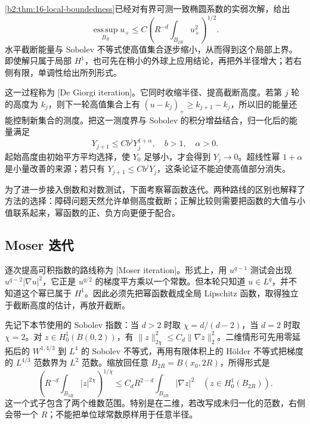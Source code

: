 \cref{b2:thm:16-local-boundedness}已经对有界可测一致椭圆系数的实弱次解，给出
\[
 \operatorname*{ess\,sup}_{B_R}u_+
 \leq C\left(R^{-d}\int_{B_{2R}}u_+^2\right)^{1/2}.
\]
水平截断能量与 Sobolev 不等式使高值集合逐步缩小，从而得到这个局部上界。即使解只属于局部 \(H^1\)，也可先在稍小的外球上应用结论，再把外半径增大；若右侧有限，单调性给出所列形式。

\ProseParagraphBreak

这一过程称为 [De Giorgi iteration]。它同时收缩半径、提高截断高度。若第 \(j\) 轮的高度为 \(k_j\)，则下一轮高值集合上有
\((u-k_j)_+\geq k_{j+1}-k_j\)，所以旧的能量还能控制新集合的测度。把这一测度界与 Sobolev 的积分增益结合，归一化后的能量满足
\[
 Y_{j+1}\leq Cb^jY_j^{1+\alpha},
 \quad b>1,\quad\alpha>0.
\]
起始高度由初始平方平均选择，使 \(Y_0\) 足够小，才会得到 \(Y_j\to0\)。超线性幂 \(1+\alpha\) 是小量改善的来源；若只有 \(Y_{j+1}\leq Cb^jY_j\)，这条论证不能迫使高值部分消失。

\ProseParagraphBreak

为了进一步接入倒数和对数测试，下面考察幂函数迭代。两种路线的区别也解释了方法的选择：障碍问题天然允许单侧高度截断；正解比较则需要把函数的大值与小值联系起来，幂函数的正、负方向更便于配合。

\subsection{Moser 迭代}
\label{b2:subsec:H20103}

逐次提高可积指数的路线称为 [Moser iteration]。形式上，用 \(u^{q-1}\) 测试会出现 \(u^{q-2}|\nabla u|^2\)，它正是 \(u^{q/2}\) 的梯度平方乘以一个常数。但本轮只知道 \(u\in L^q\)，并不知道这个幂已属于 \(H^1\)。因此必须先把幂函数截成全局 Lipschitz 函数，取得独立于截断高度的估计，再放开截断。

\ProseParagraphBreak

先记下本节使用的 Sobolev 指数：当 \(d>2\) 时取 \(\chi=d/(d-2)\)，当 \(d=2\) 时取 \(\chi=2\)。对 \(z\in H_0^1(B(0,2))\)，有
\(\|z\|_{2\chi}^2\leq C_d\|\nabla z\|_2^2\)。二维情形可先用零延拓后的 \(W^{1,4/3}\) 到 \(L^4\) 的 Sobolev 不等式，再用有限体积上的 Hölder 不等式把梯度的 \(L^{4/3}\) 范数界为 \(L^2\) 范数。缩放回任意 \(B_{2R}=B(x_0,2R)\)，所得形式是
\begin{equation}\label{b2:eq:H2-scaled-sobolev}
 \left(R^{-d}\int_{B_{2R}}|z|^{2\chi}\right)^{1/\chi}
 \leq C_dR^{2-d}\int_{B_{2R}}|\nabla z|^2
 \quad(z\in H_0^1(B_{2R})).
\end{equation}
这一个式子包含了两个维数范围。特别是在二维，若改写成未归一化的范数，右侧会带一个 \(R\)；不能把单位球常数原样用于任意半径。

